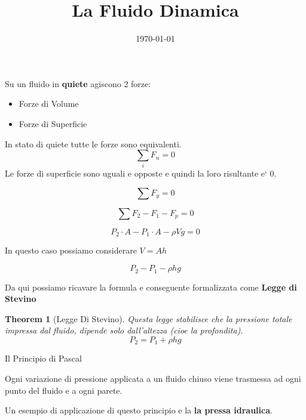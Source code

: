 \documentclass[11pt]{article}
\title{La Fluido Dinamica}
\date{\today}
\newtheorem{theorem}{Theorem}
\begin{document}
\maketitle

Su un fluido in \textbf{quiete} agiscono 2 forze:

\begin{itemize}
\item Forze di Volume
\item Forze di Superficie
\end{itemize}

In stato di quiete tutte le forze sono equivalenti.
$$\sum_{i} F_n = 0$$
Le forze di superficie sono uguali e opposte e quindi la loro risultante e` 0.


$$\sum F_y = 0$$

$$\sum F_2 - F_1 - F_p = 0$$

$$P_2 \cdot A - P_1 \cdot A - \rho Vg = 0$$

In questo caso possiamo considerare $V = Ah$

$$P_2 - P_1 - \rho hg$$

Da qui possiamo ricavare la formula e conseguente formalizzata come \textbf{Legge di Stevino}

\begin{theorem}[Legge Di Stevino]
Questa legge stabilisce che la pressione totale impressa dal fluido, dipende solo dall'altezza (cioe la profondita).
\[P_2 = P_1 + \rho hg\]
\end{theorem}

\newpage

\begin{Large}
Il Principio di Pascal

\end{Large}

Ogni variazione di pressione applicata a un fluido chiuso viene trasmessa ad ogni punto del fluido e a ogni parete.

Un esempio di applicazione di questo principio e la \textbf{la pressa idraulica}.

\end{document}
